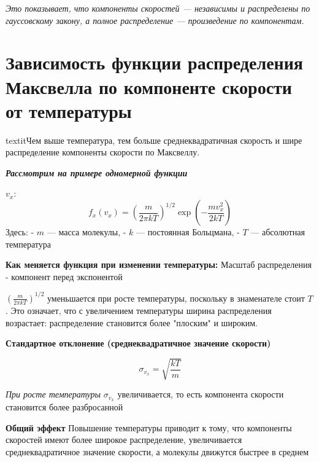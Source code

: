 \documentclass[14pt]{article}
\begin{document}
\textit{Это показывает, что компоненты скоростей — независимы и распределены по гауссовскому закону, а полное распределение — произведение по компонентам.}


    
\section{Зависимость функции распределения Максвелла по компоненте скорости от температуры}
\begin{center}
   textit{Чем выше температура, тем больше среднеквадратичная скорость и шире распределение компоненты скорости по Максвеллу.}
\end{center}

\textbf{\textit{Рассмотрим на примере одномерной функции}}
\begin{center}
     \(v_x\): \[ f_x(v_x) = \left(\frac{m}{2\pi k T}\right)^{1/2} \exp\left(-\frac{m v_x^2}{2k T}\right) \]
    Здесь: - \(m\) — масса молекулы, - \(k\) — постоянная Больцмана, - \(T\) — абсолютная температура
\end{center}

\textbf{Как меняется функция при изменении температуры:}
\newline Масштаб распределения - компонент перед экспонентой 
\begin{center}
    \(\left(\frac{m}{2\pi k T}\right)^{1/2}\)
    уменьшается при росте температуры, поскольку в знаменателе стоит \(T\). Это означает, что с увеличением температуры ширина распределения возрастает: распределение становится более "плоским" и широким.
\end{center}

\textbf{Стандартное отклонение (среднеквадратичное значение скорости)}
\newline \begin{center}
    \[ \sigma_{v_x} = \sqrt{\frac{k T}{m}} \]
\end{center}

\textit{При росте температуры} \(\sigma_{v_x}\) увеличивается, то есть компонента скорости становится более разбросанной

\textbf{Общий эффект}
\newline Повышение температуры приводит к тому, что компоненты скоростей имеют более широкое распределение, увеличивается среднеквадратичное значение скорости, а молекулы движутся быстрее в среднем
\end{document}
